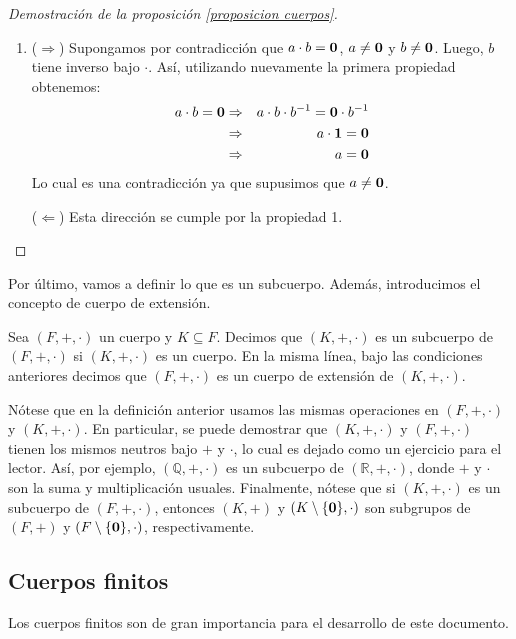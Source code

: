 \begin{proof}[Demostración de la proposición \ref{proposicion cuerpos}]
\begin{enumerate}
	\item ($\Rightarrow$)
	Supongamos por contradicción que $a\cdot b=\mathbf{0}$, $a\neq \mathbf{0}$ y $b \neq \mathbf{0}$. Luego, $b$ tiene inverso bajo $\cdot$. Así, utilizando nuevamente la primera propiedad obtenemos:
	\begin{eqnarray*}
		a\cdot b = \mathbf{0} &\Rightarrow& a\cdot b\cdot b^{-1} = \mathbf{0} \cdot b^{-1}\\
       &\Rightarrow& a\cdot \mathbf{1} = \mathbf{0}\\
       &\Rightarrow& a = \mathbf{0}
	\end{eqnarray*}
	Lo cual es una contradicción ya que supusimos que $a\neq \mathbf{0}$.
	
	($\Leftarrow$)
	Esta dirección se cumple por la propiedad 1.
	
	\qedhere
	\end{enumerate}
\end{proof}
Por último, vamos a definir lo que es un subcuerpo. Además, introducimos el concepto de cuerpo de extensión.
\begin{definition}
Sea $(F,+,\cdot)$ un cuerpo y $K\subseteq F$. Decimos que $(K,
+, \cdot)$ es un subcuerpo de $(F,+,\cdot)$ si $(K, +, \cdot)$ es un
cuerpo. En la misma línea, bajo las condiciones anteriores decimos que
$(F,+,\cdot)$ es un cuerpo de extensión de $(K,+,\cdot)$.
\end{definition}

Nótese que en la definición anterior usamos las mismas operaciones en
$(F,+,\cdot)$ y $(K, +, \cdot)$. En particular, se puede demostrar que
$(K, +, \cdot)$ y $(F,+,\cdot)$ tienen los mismos neutros bajo $+$ y
$\cdot$, lo cual es dejado como un ejercicio para el lector. Así, por
ejemplo, $(\mathbb{Q}, +, \cdot)$ es un subcuerpo de $(\mathbb{R},
+, \cdot)$, donde $+$ y $\cdot$ son la suma y multiplicación
usuales. Finalmente, nótese que si $(K, +, \cdot)$ es un subcuerpo de
$(F,+,\cdot)$, entonces $(K, +)$ y $(K \setminus \{\mathbf{0}\}, \cdot)$ son
subgrupos de $(F, +)$ y $(F \setminus \{\mathbf{0}\}, \cdot)$,
respectivamente.



\subsection{Cuerpos finitos}
Los cuerpos finitos son de gran importancia para el desarrollo de este
documento.

